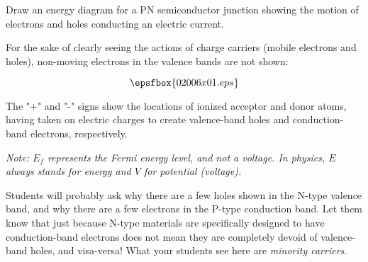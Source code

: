  

Draw an energy diagram for a PN semiconductor junction showing the motion of electrons and holes conducting an electric current.







For the sake of clearly seeing the actions of charge carriers (mobile electrons and holes), non-moving electrons in the valence bands are not shown:

$$\epsfbox{02006x01.eps}$$

The "+" and "-" signs show the locations of ionized acceptor and donor atoms, having taken on electric charges to create valence-band holes and conduction-band electrons, respectively.

\vskip 10pt

{\it Note: $E_f$ represents the Fermi energy level, and not a voltage.  In physics, $E$ always stands for energy and $V$ for potential (voltage).} 







Students will probably ask why there are a few holes shown in the N-type valence band, and why there are a few electrons in the P-type conduction band.  Let them know that just because N-type materials are specifically designed to have conduction-band electrons does not mean they are completely devoid of valence-band holes, and visa-versa!  What your students see here are {\it minority carriers}.




